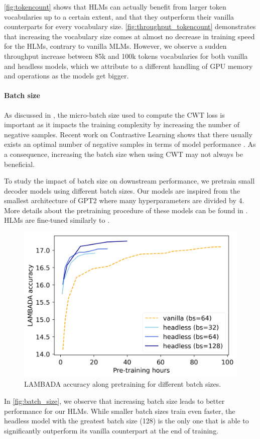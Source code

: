 \autoref{fig:tokencount} shows that HLMs can actually benefit from larger token vocabularies up to a certain extent, and that they outperform their vanilla counterparts for every vocabulary size. \autoref{fig:throughput_tokencount} demonstrates that increasing the vocabulary size comes at almost no decrease in training speed for the HLMs, contrary to vanilla MLMs. However, we observe a sudden throughput increase between 85k and 100k tokens vocabularies for both vanilla and headless models, which we attribute to a different handling of GPU memory and operations as the models get bigger.

\paragraph{Batch size}

As discussed in , the micro-batch size used to compute the CWT loss is important as it impacts the training complexity by increasing the number of negative samples. Recent work on Contrastive Learning shows that there usually exists an optimal number of negative samples in terms of model performance \citep{contr1, contr2}. As a consequence, increasing the batch size when using CWT may not always be beneficial.

To study the impact of batch size on downstream performance, we pretrain small decoder models using different batch sizes. Our models are inspired from the smallest architecture of GPT2 \citep{gpt2} where many hyperparameters are divided by 4. More details about the pretraining procedure of these models can be found in . HLMs are fine-tuned similarly to .

\begin{figure}[h]
    \centering
    \includegraphics[width=0.40\linewidth]{sources/part_2/headless/imgs/batch_size_hours_p13.png}
    \caption{LAMBADA accuracy along pretraining for different batch sizes.}
    \label{fig:batch_size}
\end{figure}

In \autoref{fig:batch_size}, we observe that increasing batch size  leads to better performance for our HLMs. While smaller batch sizes train even faster, the headless model with the greatest batch size (128) is the only one that is able to significantly outperform its vanilla counterpart at the end of training.

